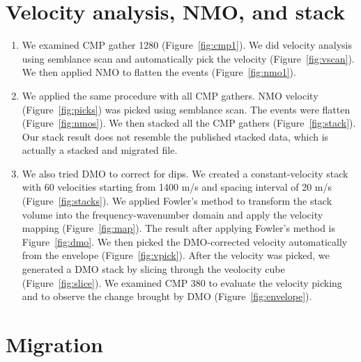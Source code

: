 \section{Velocity analysis, NMO, and stack}

\begin{enumerate}

\item We examined CMP gather 1280 (Figure~\ref{fig:cmp1}). We did velocity analysis using semblance scan and automatically pick the velocity (Figure~\ref{fig:vscan}). We then applied NMO to flatten the events (Figure~\ref{fig:nmo1}).   


\item We applied the same procedure with all CMP gathers. NMO velocity (Figure~\ref{fig:picks}) was picked using semblance scan. The events were flatten (Figure~\ref{fig:nmos}). We then stacked all the CMP gathers (Figure~\ref{fig:stack}). Our stack result does not resemble the published stacked data, which is actually a stacked and migrated file.


\item We also tried DMO to correct for dips. We created a constant-velocity stack with 60 velocities starting from 1400 m/s and spacing interval of 20 m/s (Figure~\ref{fig:stacks}). We applied Fowler's method to transform the stack volume into the frequency-wavenumber domain and apply the velocity mapping (Figure~\ref{fig:map}). The result after applying Fowler's method is Figure~\ref{fig:dmo}. We then picked the DMO-corrected velocity automatically from the envelope (Figure~\ref{fig:vpick}). After the velocity was picked, we generated a DMO stack by slicing through the veolocity cube (Figure~\ref{fig:slice}). We examined CMP 380 to evaluate the velocity picking and to observe the change brought by DMO (Figure~\ref{fig:envelope}).      


\end{enumerate}

\section{Migration}







